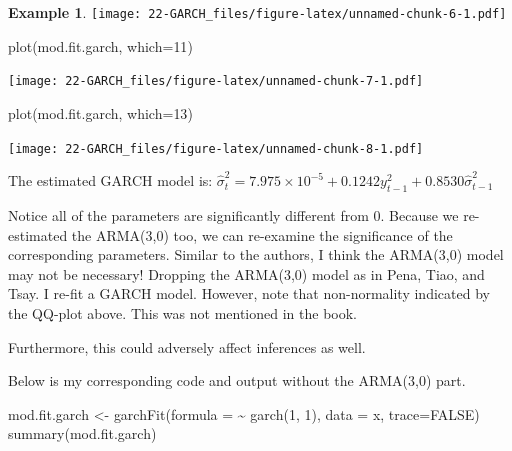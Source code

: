 \documentclass[
]{book}
\newenvironment{Shaded}{\begin{snugshade}}{\end{snugshade}}
\newcommand{\AttributeTok}[1]{\textcolor[rgb]{0.77,0.63,0.00}{#1}}
\newcommand{\ConstantTok}[1]{\textcolor[rgb]{0.00,0.00,0.00}{#1}}
\newcommand{\DecValTok}[1]{\textcolor[rgb]{0.00,0.00,0.81}{#1}}
\newcommand{\FunctionTok}[1]{\textcolor[rgb]{0.00,0.00,0.00}{#1}}
\newcommand{\NormalTok}[1]{#1}
\newcommand{\OtherTok}[1]{\textcolor[rgb]{0.56,0.35,0.01}{#1}}
\newcommand{\SpecialCharTok}[1]{\textcolor[rgb]{0.00,0.00,0.00}{#1}}
\theoremstyle{definition}
\theoremstyle{definition}
\newtheorem{example}{Example}[chapter]
\theoremstyle{definition}
\theoremstyle{definition}
\theoremstyle{remark}
\begin{document}
\begin{example}
\texttt{[image: 22-GARCH\_files/figure-latex/unnamed-chunk-6-1.pdf]}

\begin{Shaded}
\begin{Highlighting}[]
\FunctionTok{plot}\NormalTok{(mod.fit.garch, }\AttributeTok{which=}\DecValTok{11}\NormalTok{)}
\end{Highlighting}
\end{Shaded}

\texttt{[image: 22-GARCH\_files/figure-latex/unnamed-chunk-7-1.pdf]}

\begin{Shaded}
\begin{Highlighting}[]
\FunctionTok{plot}\NormalTok{(mod.fit.garch, }\AttributeTok{which=}\DecValTok{13}\NormalTok{)}
\end{Highlighting}
\end{Shaded}

\texttt{[image: 22-GARCH\_files/figure-latex/unnamed-chunk-8-1.pdf]}

The estimated GARCH model is: \(\hat \sigma^2_t= 7.975\times 10^{-5} + 0.1242y^2_{t-1} + 0.8530\hat \sigma^2_{t-1}\)

Notice all of the parameters are significantly different from 0. Because we re-estimated the ARMA(3,0) too, we can re-examine the significance of the corresponding parameters. Similar to the authors, I think the ARMA(3,0) model may not be necessary! Dropping the ARMA(3,0) model as in Pena, Tiao, and Tsay. I re-fit a GARCH model. However, note that non-normality indicated by the QQ-plot above. This was not mentioned in the book.

Furthermore, this could adversely affect inferences as well.

Below is my corresponding code and output without the ARMA(3,0) part.

\begin{Shaded}
\begin{Highlighting}[]
\NormalTok{mod.fit.garch }\OtherTok{\textless{}{-}} \FunctionTok{garchFit}\NormalTok{(}\AttributeTok{formula =} \SpecialCharTok{\textasciitilde{}} \FunctionTok{garch}\NormalTok{(}\DecValTok{1}\NormalTok{, }\DecValTok{1}\NormalTok{), }\AttributeTok{data =} 
\NormalTok{    x, }\AttributeTok{trace=}\ConstantTok{FALSE}\NormalTok{)}
\FunctionTok{summary}\NormalTok{(mod.fit.garch)}
\end{Highlighting}
\end{Shaded}


\end{example}
\end{document}
